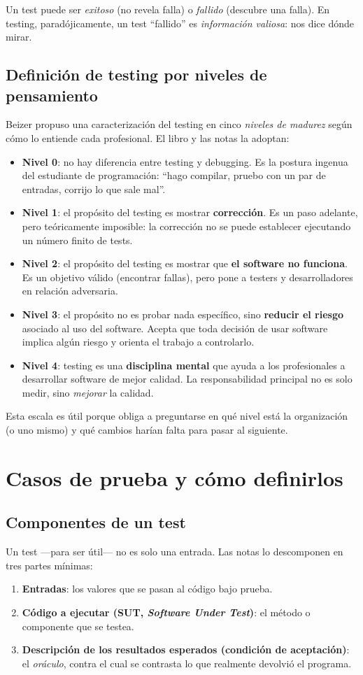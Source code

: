 \documentclass[12pt,a4paper]{article}
\begin{document}
Un test puede ser \textit{exitoso} (no revela falla) o \textit{fallido} (descubre una falla). En testing, paradójicamente, un test ``fallido'' es \textit{información valiosa}: nos dice dónde mirar.

\subsection{Definición de testing por niveles de pensamiento}
Beizer propuso una caracterización del testing en cinco \textit{niveles de madurez} según cómo lo entiende cada profesional. El libro y las notas la adoptan:

\begin{itemize}
  \item \textbf{Nivel 0}: no hay diferencia entre testing y debugging. Es la postura ingenua del estudiante de programación: ``hago compilar, pruebo con un par de entradas, corrijo lo que sale mal''.
  \item \textbf{Nivel 1}: el propósito del testing es mostrar \textbf{corrección}. Es un paso adelante, pero teóricamente imposible: la corrección no se puede establecer ejecutando un número finito de tests.
  \item \textbf{Nivel 2}: el propósito del testing es mostrar que \textbf{el software no funciona}. Es un objetivo válido (encontrar fallas), pero pone a testers y desarrolladores en relación adversaria.
  \item \textbf{Nivel 3}: el propósito no es probar nada específico, sino \textbf{reducir el riesgo} asociado al uso del software. Acepta que toda decisión de usar software implica algún riesgo y orienta el trabajo a controlarlo.
  \item \textbf{Nivel 4}: testing es una \textbf{disciplina mental} que ayuda a los profesionales a desarrollar software de mejor calidad. La responsabilidad principal no es solo medir, sino \textit{mejorar} la calidad.
\end{itemize}

Esta escala es útil porque obliga a preguntarse en qué nivel está la organización (o uno mismo) y qué cambios harían falta para pasar al siguiente.

\section{Casos de prueba y cómo definirlos}
\subsection{Componentes de un test}
Un test ---para ser útil--- no es solo una entrada. Las notas lo descomponen en tres partes mínimas:
\begin{enumerate}
  \item \textbf{Entradas}: los valores que se pasan al código bajo prueba.
  \item \textbf{Código a ejecutar (SUT, \textit{Software Under Test})}: el método o componente que se testea.
  \item \textbf{Descripción de los resultados esperados (condición de aceptación)}: el \textit{oráculo}, contra el cual se contrasta lo que realmente devolvió el programa.
\end{enumerate}
\end{document}
